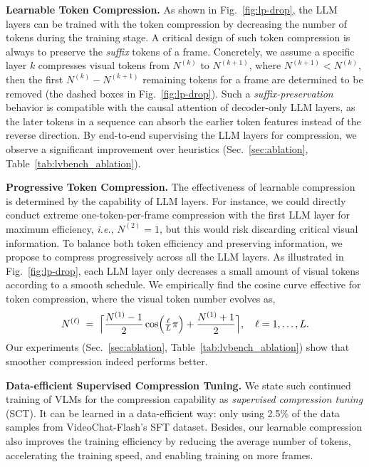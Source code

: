 \noindent\textbf{Learnable Token Compression.}\;\; As shown in Fig.~\ref{fig:lp-drop}, the LLM layers can be trained with the token compression by decreasing the number of tokens during the training stage. A critical design of such token compression is always to preserve the \emph{suffix} tokens of a frame. Concretely, we assume a specific layer $k$ compresses visual tokens from $N^{(k)}$ to $N^{(k+1)}$, where $N^{(k+1)} < N^{(k)}$, then the first $N^{(k)} - N^{(k+1)}$ remaining tokens for a frame are determined to be removed (the dashed boxes in Fig.~\ref{fig:lp-drop}). Such a \emph{suffix-preservation} behavior is compatible with the causal attention of decoder-only LLM layers, as the later tokens in a sequence can absorb the earlier token features instead of the reverse direction. By end-to-end supervising the LLM layers for compression, we observe a significant improvement over heuristics (Sec.~\ref{sec:ablation}, Table~\ref{tab:lvbench_ablation}).

\noindent\textbf{Progressive Token Compression.}\;\; The effectiveness of learnable compression is determined by the capability of LLM layers. For instance, we could directly conduct extreme one-token-per-frame compression with the first LLM layer for maximum efficiency, \emph{i.e.}, $N^{(2)}=1$, but this would risk discarding critical visual information. To balance both token efficiency and preserving information, we propose to compress progressively across all the LLM layers. As illustrated in Fig.~\ref{fig:lp-drop}, each LLM layer only decreases a small amount of visual tokens according to a smooth schedule. We empirically find the cosine curve effective for token compression, where the visual token number evolves as,
\begin{equation}
    N^{(\ell)} \;=\;
      \Bigl\lceil
        \frac{N^{(1)}-1}{2}\cos\Bigl(\tfrac{\ell}{L}\pi\Bigr)
        +\frac{N^{(1)}+1}{2}
      \Bigr\rceil,
    \quad \ell=1,\dots,L.                  \label{eq:cosine}
\end{equation}
Our experiments (Sec.~\ref{sec:ablation}, Table~\ref{tab:lvbench_ablation}) show that smoother compression indeed performs better.

\noindent\textbf{Data-efficient Supervised Compression Tuning.}\;\; We state such continued training of VLMs for the compression capability as \emph{supervised compression tuning} (SCT). It can be learned in a data-efficient way: only using 2.5\% of the data samples from VideoChat-Flash's SFT dataset. Besides, our learnable compression also improves the training efficiency by reducing the average number of tokens, accelerating the training speed, and enabling training on more frames. 


